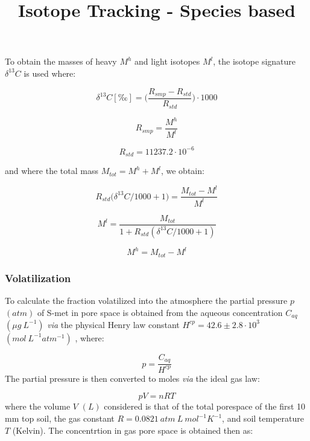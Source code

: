 \documentclass[]{article}
\title{Isotope Tracking - Species based}
\author{}
\date{}
\begin{document}
\maketitle

To obtain the masses of heavy \(M^h\) and light isotopes \(M^l\), the
isotope signature \(\delta ^{13}C\) is used where:

\[
\delta ^{13}C [‰] = \Big(\frac{R_{smp} - R_{std}}{R_{std}}\Big)\cdot 1000
\]

\[
R_{smp} = \frac{M^h}{M^l} 
\]

\[
R_{std} = 11237.2 \cdot 10^{-6}
\]

and where the total mass \(M_{tot} = M^h + M^l\), we obtain:

\[
R_{std}\Big(\delta ^{13}C/1000+1 \Big)= \frac{M_{tot}-M^l}{M^l}
\]

\[
M^l = \frac{M_{tot}}{1+R_{std}(\delta ^{13}C/1000+1)}
\]

\[
M^h = M_{tot} - M^l 
\]

\subsubsection{Volatilization}\label{volatilization}

To calculate the fraction volatilized into the atmosphere the partial
pressure \(p\) \((atm)\) of S-met in pore space is obtained from the
aqueous concentration \(C_{aq}\) \((\mu g~L^{-1})\) \textit{via} the
physical Henry law constant \(H^{cp} = 42.6 \pm 2.8 \cdot10^3\)
\((mol~L^{-1} atm^{-1})\) \citep{Feigenbrugel2004}, where:

\[
p = \frac{C_{aq}}{H^{cp}}
\] The partial pressure is then converted to moles \textit{via} the
ideal gas law:

\[
pV = nRT
\] where the volume \(V\) \((L)\) considered is that of the total
porespace of the first 10 mm top soil, the gas constant
\(R = 0.0821~atm~L~mol^{-1}K^{-1}\), and soil temperature \(T\)
(Kelvin). The concentrtion in gas pore space is obtained then as:
\end{document}
